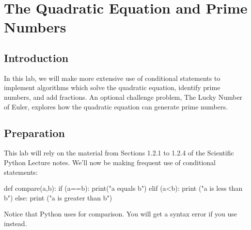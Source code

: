 \chapter{The Quadratic Equation and Prime Numbers}

\section{Introduction}

In this lab, we will make more extensive use of conditional statements
to implement algorithms which solve the quadratic equation, identify
prime numbers, and add fractions.  An optional challenge problem,
The Lucky Number of Euler, explores how the quadratic equation can
generate prime numbers.

\section{Preparation}

This lab will rely on the material from Sections 1.2.1 to 1.2.4 of the
Scientific Python Lecture notes.  We'll now be making frequent use of
conditional statements:
\begin{python}
def compare(a,b):
    if (a==b):
        print("a equals b")
    elif (a<b):
        print ("a is less than b")
    else:
        print ("a is greater than b")
\end{python}
Notice that Python uses \pyth{==} for comparison.  You will get a
syntax error if you use  instead.

